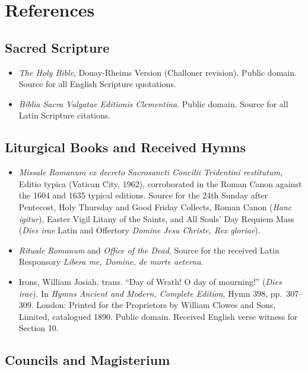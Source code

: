 \section{References}

\begingroup
\small
\ifdefined\TriptychPrintEdition
{}
\else
\fi
\subsection*{Sacred Scripture}

\begin{itemize}
\item \textit{The Holy Bible}, Douay-Rheims Version (Challoner revision). Public domain. Source for all English Scripture quotations.
\item \textit{Biblia Sacra Vulgatae Editionis Clementina}. Public domain. Source for all Latin Scripture citations.
\end{itemize}

\subsection*{Liturgical Books and Received Hymns}

\begin{itemize}
\item \textit{Missale Romanum ex decreto Sacrosancti Concilii Tridentini restitutum}, Editio typica (Vatican City, 1962), corroborated in the Roman Canon against the 1604 and 1635 typical editions. Source for the 24th Sunday after Pentecost, Holy Thursday and Good Friday Collects, Roman Canon (\textit{Hanc igitur}), Easter Vigil Litany of the Saints, and All Souls' Day Requiem Mass (\textit{Dies irae} Latin and Offertory \textit{Domine Jesu Christe, Rex gloriae}).
\item \textit{Rituale Romanum} and \textit{Office of the Dead}. Source for the received Latin Responsory \textit{Libera me, Domine, de morte aeterna}.
\item Irons, William Josiah, trans. ``Day of Wrath! O day of mourning!'' (\textit{Dies irae}). In \textit{Hymns Ancient and Modern, Complete Edition}, Hymn 398, pp.\ 307--309. London: Printed for the Proprietors by William Clowes and Sons, Limited, catalogued 1890. Public domain. Received English verse witness for Section 10.
\end{itemize}

\subsection*{Councils and Magisterium}

